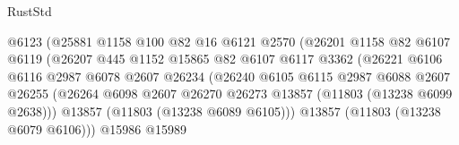 \begin{lexlean}{RustStd}
\begin{coremodule}
                                        @6123
                                        (@25881
                                          @1158
                                          @100
                                          @82
                                          @16
                                          @6121
                                          @2570
                                          (@26201
                                            @1158
                                            @82
                                            @6107
                                            @6119
                                            (@26207
                                              @445
                                              @1152
                                              @15865
                                              @82
                                              @6107
                                              @6117
                                              @3362
                                              (@26221
                                                @6106
                                                @6116
                                                @2987
                                                @6078
                                                @2607
                                                @26234
                                                (@26240
                                                  @6105
                                                  @6115
                                                  @2987
                                                  @6088
                                                  @2607
                                                  @26255
                                                  (@26264
                                                    @6098
                                                    @2607
                                                    @26270
                                                    @26273
                                                    @13857
                                                    (@11803 (@13238 @6099 @2638)))
                                                  @13857
                                                  (@11803 (@13238 @6089 @6105)))
                                                @13857
                                                (@11803 (@13238 @6079 @6106)))
                                              @15986
                                              @15989

\end{coremodule}
\end{lexlean}
